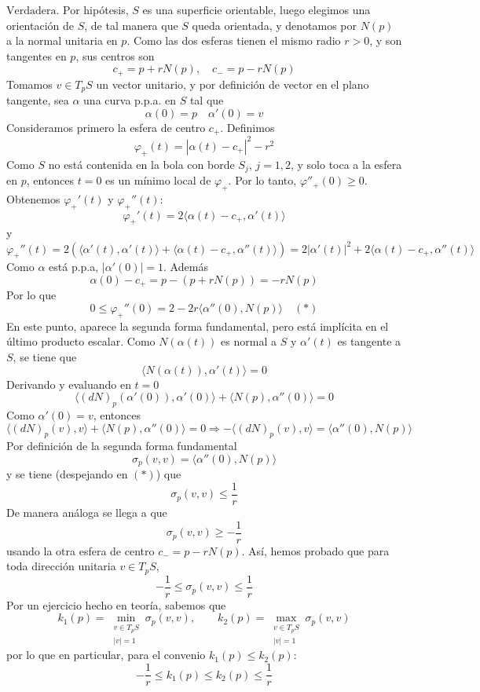 \documentclass[12pt]{article}
\newcommand{\prodesc}[2]{\langle #1, #2 \rangle}
\begin{document}
\begin{ejercicio}
\begin{enumerate}
            $\boxed{\text{Verdadera}}$. Por hipótesis, $S$ es una superficie orientable, luego elegimos una orientación de $S$,
            de tal manera que $S$ queda orientada, y denotamos por $N(p)$ a la normal unitaria en $p$. Como las dos esferas
            tienen el mismo radio $r>0$, y son tangentes en $p$, sus centros son $$c_{+} = p + rN(p), \quad c_{-} = p - rN(p)$$
            Tomamos $v \in T_pS$ un vector unitario, y por definición de vector en el plano tangente, sea $\alpha$ una curva p.p.a.
            en $S$ tal que $$\alpha(0) = p \quad \alpha'(0) = v$$
            Consideramos primero la esfera de centro $c_{+}$. Definimos
            $$\varphi_{+}(t) = |\alpha(t) - c_{+}|^2 - r^2$$
            Como $S$ no está contenida en la bola con borde $S_j$, $j = 1,2$, y solo toca a la esfera en $p$, entonces
            $t = 0$ es un mínimo local de $\varphi_{+}$. Por lo tanto, $\varphi''_{+}(0) \geq 0$. Obtenemos $\varphi_+'(t)$ y $\varphi_+''(t)$:
            $$\varphi_{+}'(t) = 2 \prodesc{\alpha(t) - c_{+}}{\alpha'(t)}$$
            y 
            $$\varphi_{+}''(t) = 2(\prodesc{\alpha'(t)}{\alpha'(t)} + \prodesc{\alpha(t) - c_{+}}{\alpha''(t)}) = 
            2|\alpha'(t)|^2 + 2 \prodesc{\alpha(t) - c_{+}}{\alpha''(t)}$$
            Como $\alpha$ está p.p.a, $|\alpha'(0)| = 1$. Además
            $$\alpha(0) - c_{+} = p - (p + rN(p)) = - r N(p)$$
            Por lo que $$0 \leq \varphi_{+}''(0) = 2 - 2r\prodesc{\alpha''(0)}{N(p)} \quad(*)$$
            En este punto, aparece la segunda forma fundamental, pero está implícita en el último producto escalar. 
            Como $N(\alpha(t))$ es normal a $S$ y $\alpha'(t)$ es tangente a $S$, se tiene que
            $$\prodesc{N(\alpha(t))}{\alpha'(t)} = 0$$
            Derivando y evaluando en $t=0$
            $$\prodesc{(dN)_p(\alpha'(0))}{\alpha'(0)} + \prodesc{N(p)}{\alpha''(0)} = 0$$
            Como $\alpha'(0) = v$, entonces
            $$\prodesc{(dN)_p(v)}{v} + \prodesc{N(p)}{\alpha''(0)} = 0 \Longrightarrow -\prodesc{(dN)_p(v)}{v} = \prodesc{\alpha''(0)}{N(p)}$$
            Por definición de la segunda forma fundamental $$\sigma_p(v,v) = \prodesc{\alpha''(0)}{N(p)}$$
            y se tiene (despejando en $(*)$) que $$\sigma_p(v,v) \leq \dfrac{1}{r}$$
            De manera análoga se llega a que $$\sigma_p(v,v) \geq -\dfrac{1}{r}$$
            usando la otra esfera de centro $c_{-} = p - rN(p)$. Así, hemos probado que para toda dirección unitaria 
            $v \in T_p S$, 
            $$-\dfrac{1}{r} \leq \sigma_p(v,v) \leq \dfrac{1}{r}$$
            Por un ejercicio hecho en teoría, sabemos que 
            \begin{equation*}
                k_1(p) = \min_{\substack{v\in T_pS\\|v| =1}} \sigma_p(v,v), \qquad k_2(p) = \max_{\substack{v\in T_pS\\|v| =1}}\sigma_p(v,v)
            \end{equation*}
            por lo que en particular, para el convenio $k_1(p) \leq k_2(p)$:
            $$\boxed{-\dfrac{1}{r} \leq k_1(p) \leq k_2(p) \leq \dfrac{1}{r}}$$ 
            


\end{enumerate}
\end{ejercicio}
\end{document}
